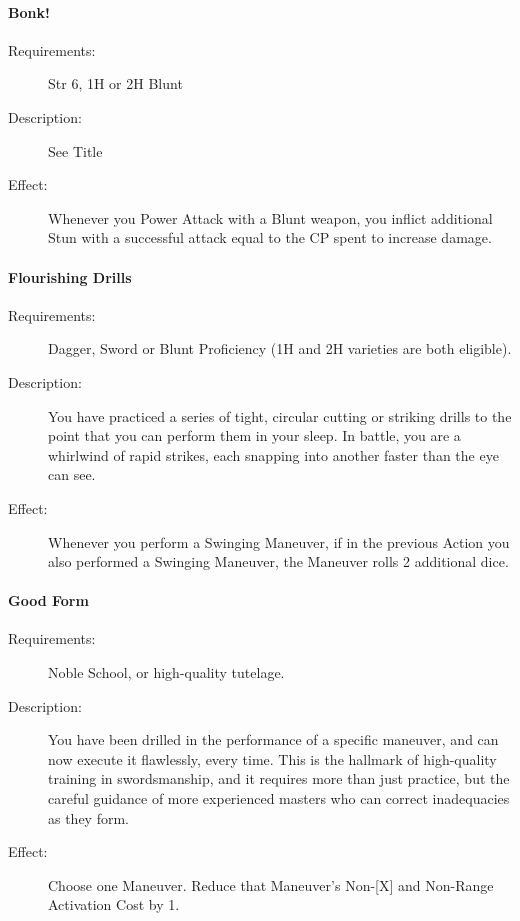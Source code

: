 \documentclass[oneside,11pt,english]{book}
\begin{document}
\paragraph{\label{talent:Bonk!}Bonk!}
\begin{description}
	\item [Requirements:] Str 6, 1H or 2H Blunt 
	\item [Description:] See Title 
	\item [Effect:] Whenever you Power Attack with a Blunt weapon, you inflict additional Stun with a successful attack equal to the CP spent to increase damage. 
\end{description}

\paragraph{\label{talent:Flourishing Drills}Flourishing Drills}
\begin{description}
	\item [Requirements:] Dagger, Sword or Blunt Proficiency (1H and 2H varieties are both eligible). 
	\item [Description:] You have practiced a series of tight, circular cutting or striking drills to the point that you can perform them in your sleep. In battle, you are a whirlwind of rapid strikes, each snapping into another faster than the eye can see. 
	\item [Effect:] Whenever you perform a Swinging Maneuver, if in the previous Action you also performed a Swinging Maneuver, the Maneuver rolls 2 additional dice. 
\end{description}

\paragraph{\label{talent:Good Form}Good Form}
\begin{description}
	\item [Requirements:] Noble School, or high-quality tutelage. 
	\item [Description:] You have been drilled in the performance of a specific maneuver, and can now execute it 
	flawlessly, every time. This is the hallmark of high-quality training in swordsmanship, and it requires 
	more than just practice, but the careful guidance of more experienced masters who can correct 
	inadequacies as they form. 
	\item [Effect:] Choose one Maneuver. Reduce that Maneuver’s Non-[X] and Non-Range Activation Cost by 1. 
	
\end{description}
\end{document}
